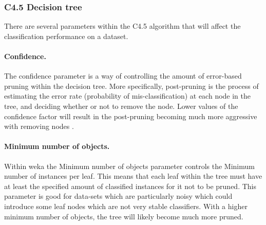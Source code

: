\documentclass[12pt]{article}
\begin{document}
    \subsubsection{C4.5 Decision tree}
      There are several parameters within the C4.5 algorithm that will affect the classification performance on a dataset.


      \paragraph{Confidence.}
        The confidence parameter is a way of controlling the amount of error-based pruning \citep{quinlan1987simplifying} within the decision tree. More specifically, post-pruning is the process of estimating the error rate (probability of mis-classification) at each node in the tree, and deciding whether or not to remove the node. Lower values of the confidence factor will result in the post-pruning becoming much more aggressive with removing nodes \citep{beck2008backward}.

      \paragraph{Minimum number of objects.}
        Within weka the Minimum number of objects parameter controls the Minimum number of instances per leaf. This means that each leaf within the tree must have at least the specified amount of classified instances for it not to be pruned. This parameter is good for data-sets which are particularly noisy which could introduce some leaf nodes which are not very stable classifiers. With a higher minimum number of objects, the tree will likely become much more pruned.


\end{document}
